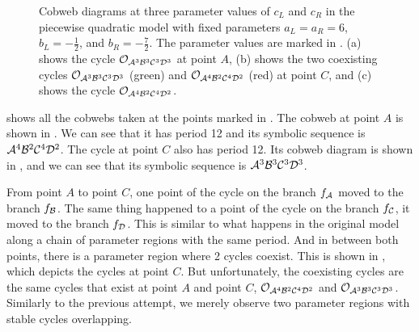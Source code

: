 \begin{figure}
	\centering
	\caption[Cobwebs of the skewed piecewise quadratic model]{
		Cobweb diagrams at three parameter values of $c_L$ and $c_R$ in the piecewise quadratic model with fixed parameters $a_L = a_R = 6$, $b_L = -\frac{1}{2}$, and $b_R = -\frac{7}{2}$.
		The parameter values are marked in .
		(a) shows the cycle $\mathcal{O}_{\mathcal{A}^3\mathcal{B}^3\mathcal{C}^3\mathcal{D}^3}$ at point $A$, (b) shows the two coexisting cycles $\mathcal{O}_{\mathcal{A}^3\mathcal{B}^3\mathcal{C}^3\mathcal{D}^3}$ (green) and $\mathcal{O}_{\mathcal{A}^4\mathcal{B}^2\mathcal{C}^4\mathcal{D}^2}$ (red) at point $C$, and (c) shows the cycle $\mathcal{O}_{\mathcal{A}^4\mathcal{B}^2\mathcal{C}^4\mathcal{D}^2}$.
	}
	\label{fig:setup.quad.skew.cobwebs}
\end{figure}

 shows all the cobwebs taken at the points marked in .
The cobweb at point $A$ is shown in .
We can see that it has period 12 and its symbolic sequence is $\mathcal{A}^4\mathcal{B}^2\mathcal{C}^4\mathcal{D}^2$.
The cycle at point $C$ also has period 12.
Its cobweb diagram is shown in , and we can see that its symbolic sequence is $\mathcal{A}^3\mathcal{B}^3\mathcal{C}^3\mathcal{D}^3$.

From point $A$ to point $C$, one point of the cycle on the branch $f_{\mathcal{A}}$ moved to the branch $f_{\mathcal{B}}$.
The same thing happened to a point of the cycle on the branch $f_{\mathcal{C}}$, it moved to the branch $f_{\mathcal{D}}$.
This is similar to what happens in the original model along a chain of parameter regions with the same period.
And in between both points, there is a parameter region where 2 cycles coexist.
This is shown in , which depicts the cycles at point $C$.
But unfortunately, the coexisting cycles are the same cycles that exist at point $A$ and point $C$, $\mathcal{O}_{\mathcal{A}^4\mathcal{B}^2\mathcal{C}^4\mathcal{D}^2}$ and $\mathcal{O}_{\mathcal{A}^3\mathcal{B}^3\mathcal{C}^3\mathcal{D}^3}$.
Similarly to the previous attempt, we merely observe two parameter regions with stable cycles overlapping.
